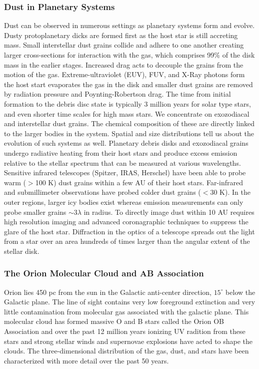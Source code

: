 \documentclass[10pt]{article}
\theoremstyle{definition}
\begin{document}
\subsubsection*{Dust in Planetary Systems}

Dust can be observed in numerous settings as planetary systems form and evolve. Dusty protoplanetary dicks are formed first as the host star is still accreting mass. Small interstellar dust grains collide and adhere to one another creating larger cross-sections for interaction with the gas, which comprises 99\% of the disk mass in the earlier stages. Increased drag acts to decouple the grains from the motion of the gas. Extreme-ultraviolet (EUV), FUV, and X-Ray photons form the host start evaporates the gas in the disk and smaller dust grains are removed by radiation pressure and Poynting-Robertson drag. The time from initial formation to the debris disc state is typically 3 million years for solar type stars, and even shorter time scales for high mass stars. We concentrate on exozodiacal and interstellar dust grains. The chemical composition of these are directly linked to the larger bodies in the system. Spatial and size distributions tell us about the evolution of such systems as well. Planetary debris disks and exozodiacal grains undergo radiative heating from their host stars and produce excess emission relative to the stellar spectrum that can be measured at various wavelengths. Sensitive infrared telescopes (Spitzer, IRAS, Herschel) have been able to probe warm ($>$100 K) dust grains within a few AU of their host stars. Far-infrared and submillimeter observations have probed colder dust grains ($<$30 K). In the outer regions, larger icy bodies exist whereas emission measurements can only probe smaller grains $\sim 3\lambda$ in radius. To directly image dust within 10 AU requires high resolution imaging and advanced coronagraphic techniques to suppress the glare of the host star. Diffraction in the optics of a telescope spreads out the light from a star over an area hundreds of times larger than the angular extent of the stellar disk. 
\subsubsection*{The Orion Molecular Cloud and AB Association}
Orion lies 450 pc from the sun in the Galactic anti-center direction, $15^{\circ}$ below the Galactic plane. The line of sight contains very low foreground extinction and very little contamination from molecular gas associated with the galactic plane. This molecular cloud has formed massive O and B stars called the Orion OB Association and over the past 12 million years ionizing UV radition from these stars and strong stellar winds and supernovae explosions have acted to shape the clouds. The three-dimensional distribution of the gas, dust, and stars have been characterized with more detail over the past 50 years. 
\end{document}
